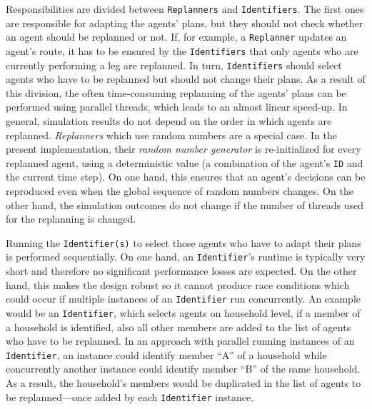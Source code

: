 Responsibilities are divided between \lstinline{Replanners} and \lstinline{Identifiers}. The first ones are responsible for adapting the agents' plans, but they should not check whether an agent should be replanned or not. If, for example, a \lstinline{Replanner} updates an agent's route, it has to be ensured by the \lstinline{Identifiers} that only agents who are currently performing a leg are replanned. In turn, \lstinline{Identifiers} should select agents who have to be replanned but should not change their plans. As a result of this division, the often time-consuming replanning of the agents' plans can be performed using parallel threads, which leads to an almost linear speed-up. In general, simulation results do not depend on the order in which agents are replanned. \emph{Replanners} which use random numbers are a special case. 
In the present implementation, their \emph{random number generator} is re-initialized for every replanned agent, using a deterministic value (\eg a combination of the agent's \lstinline|ID| and the current time step). On one hand, this ensures that an agent's decisions can be reproduced even when the global sequence of random numbers changes. On the other hand, the simulation outcomes do not change if the number of threads used for the replanning is changed.
%

Running the \lstinline{Identifier(s)} to select those agents who have to adapt their plans is performed sequentially. On one hand, an \lstinline{Identifier}'s runtime is typically very short and therefore no significant performance losses are expected. On the other hand, 
this makes the design robust so it cannot produce race conditions which could occur if multiple instances of an \lstinline{Identifier} run concurrently. An example would be an \lstinline{Identifier}, which selects agents on household level, \ie if a member of a household is identified, also all other members are added to the list of agents who have to be replanned. In an approach with parallel running instances of an \lstinline{Identifier}, an instance could identify member ``A'' of a household while concurrently another instance could identify member ``B'' of the same household. As a result, the household's members would be duplicated in the list of agents to be replanned---once added by each \lstinline{Identifier} instance.
%

